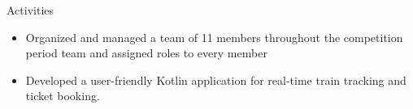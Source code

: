 \documentclass{resume}
\begin{document}
\begin{experienceSection}{Activities}
    \projectItem[
        title={ISF Innovation Catalyst Competition},
        keyHighlight={Project manager and developer for Egyptian train system solution.},
        duration={Jun 2022 – Mar 2023}
    ]
    \begin{itemize}
        \vspace{-0.5em}
        \itemsep -6pt {}
        \item Organized and managed a team of 11 members throughout the competition period team and assigned roles to every member
        \item Developed a user-friendly Kotlin application for real-time train tracking and ticket booking.
    \end{itemize}
\end{experienceSection}
\end{document}
